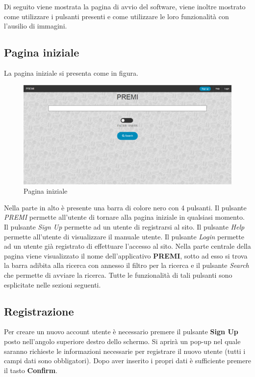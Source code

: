 Di seguito viene mostrata la pagina di avvio del software, viene inoltre mostrato come utilizzare i pulsanti presenti e come utilizzare le loro funzionalità con l'ausilio di immagini.

\subsection{Pagina iniziale}
La pagina iniziale si presenta come in figura.

\begin{figure}[H] 
	\centering 
	\includegraphics[scale=0.40] {img/pagina_iniziale.png}
	\caption{Pagina iniziale} 
\end{figure}

\noindent Nella parte in alto è presente una barra di colore nero con 4 pulsanti. Il pulsante \textit{PREMI} permette all'utente di tornare alla pagina iniziale in qualsiasi momento. Il pulsante \textit{Sign Up} permette ad un utente di registrarsi al sito. Il pulsante \textit{Help} permette all'utente di visualizzare il manuale utente. Il pulsante \textit{Login} permette ad un utente già registrato di effettuare l'accesso al sito.
Nella parte centrale della pagina viene visualizzato il nome dell'applicativo \textbf{PREMI}, sotto ad esso si trova la barra adibita alla ricerca con annesso il filtro per la ricerca e il pulsante \textit{Search} che permette di avviare la ricerca. Tutte le funzionalità di tali pulsanti sono esplicitate nelle sezioni seguenti.

\subsection{Registrazione}
Per creare un nuovo account utente è necessario premere il pulsante \textbf{Sign Up} posto nell'angolo superiore destro dello schermo. Si aprirà un pop-up nel quale saranno richieste le informazioni necessarie per registrare il nuovo utente (tutti i campi dati sono obbligatori). Dopo aver inserito i propri dati è sufficiente premere il tasto \textbf{Confirm}.

